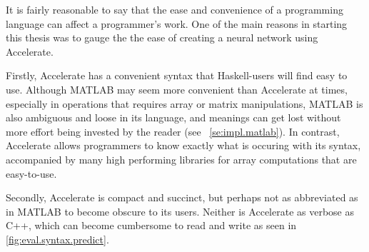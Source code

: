 It is fairly reasonable to say that the ease and convenience of a programming language can affect a programmer's work. One of the main reasons in starting this thesis was to gauge the the ease of creating a neural network using Accelerate.

Firstly, Accelerate has a convenient syntax that Haskell-users will find easy to use. Although MATLAB may seem more convenient than Accelerate at times, especially in operations that requires array or matrix manipulations, MATLAB is also ambiguous and loose in its language, and meanings can get lost without more effort being invested by the reader (see ~\ref{se:impl.matlab}). In contrast, Accelerate allows programmers to know exactly what is occuring with its syntax, accompanied by many high performing libraries for array computations that are easy-to-use.

Secondly, Accelerate is compact and succinct, but perhaps not as abbreviated as in MATLAB to become obscure to its users. Neither is Accelerate as verbose as C++, which can become cumbersome to read and write as seen in \ref{fig:eval.syntax.predict}.

